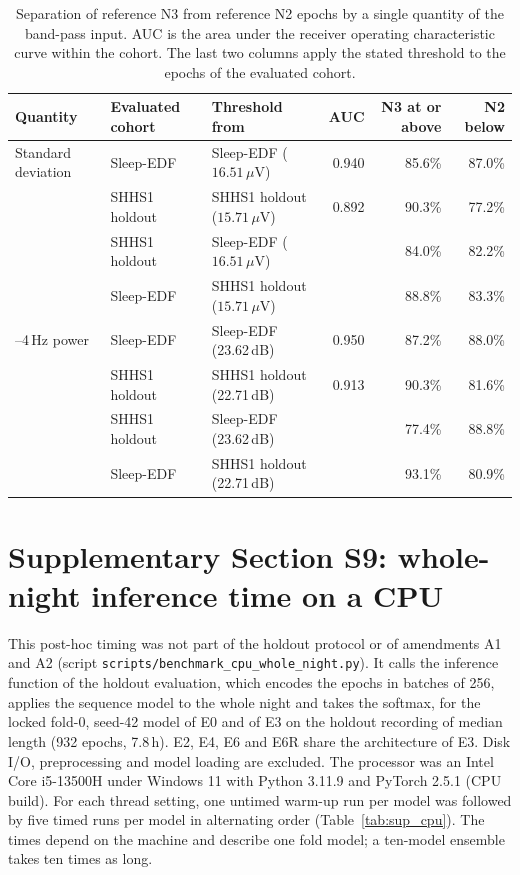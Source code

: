 \documentclass[10pt,a4paper]{article}
\begin{document}
\begin{table}[H]
\centering\small
\caption{Separation of reference N3 from reference N2 epochs by a single quantity of the band-pass
input. AUC is the area under the receiver operating characteristic curve within the cohort. The last
two columns apply the stated threshold to the epochs of the evaluated cohort.}
\label{tab:sup_stage_sep}
\begin{tabular}{lllrrr}
\toprule
Quantity & Evaluated cohort & Threshold from & AUC & N3 at or above & N2 below \\
\midrule
Standard deviation & Sleep-EDF & Sleep-EDF ($16.51\,\mu$V) & 0.940 & 85.6\% & 87.0\% \\
 & SHHS1 holdout & SHHS1 holdout ($15.71\,\mu$V) & 0.892 & 90.3\% & 77.2\% \\
 & SHHS1 holdout & Sleep-EDF ($16.51\,\mu$V) & & 84.0\% & 82.2\% \\
 & Sleep-EDF & SHHS1 holdout ($15.71\,\mu$V) & & 88.8\% & 83.3\% \\
\addlinespace
0.5--4\,Hz power & Sleep-EDF & Sleep-EDF (23.62\,dB) & 0.950 & 87.2\% & 88.0\% \\
 & SHHS1 holdout & SHHS1 holdout (22.71\,dB) & 0.913 & 90.3\% & 81.6\% \\
 & SHHS1 holdout & Sleep-EDF (23.62\,dB) & & 77.4\% & 88.8\% \\
 & Sleep-EDF & SHHS1 holdout (22.71\,dB) & & 93.1\% & 80.9\% \\
\bottomrule
\end{tabular}
\end{table}

\section*{Supplementary Section S9: whole-night inference time on a CPU}
\label{sec:sup_cpu}

This post-hoc timing was not part of the holdout protocol or of amendments A1 and A2 (script
\nolinkurl{scripts/benchmark_cpu_whole_night.py}). It calls the inference function of the holdout
evaluation, which encodes the epochs in batches of 256, applies the sequence model to the whole night
and takes the softmax, for the locked fold-0, seed-42 model of E0 and of E3 on the holdout recording of
median length (932 epochs, 7.8\,h). E2, E4, E6 and E6R share the architecture of E3. Disk I/O,
preprocessing and model loading are excluded. The processor was an Intel Core i5-13500H under Windows 11
with Python 3.11.9 and PyTorch 2.5.1 (CPU build). For each thread setting, one untimed warm-up run per
model was followed by five timed runs per model in alternating order (Table~\ref{tab:sup_cpu}). The
times depend on the machine and describe one fold model; a ten-model ensemble takes ten times as long.
\end{document}
